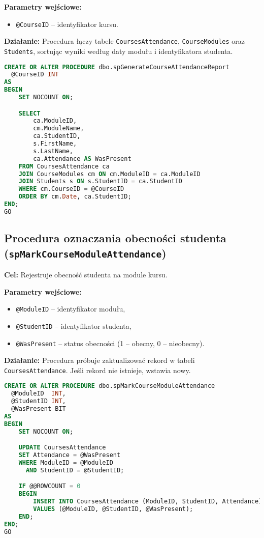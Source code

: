\documentclass[12pt]{article}
\begin{document}
\textbf{Parametry wejściowe:}
\begin{itemize}
  \item \verb|@CourseID| – identyfikator kursu.
\end{itemize}

\textbf{Działanie:} Procedura łączy tabele \verb|CoursesAttendance|, \verb|CourseModules| oraz \verb|Students|, sortując wyniki według daty modułu i identyfikatora studenta.

\begin{lstlisting}[language=SQL]
CREATE OR ALTER PROCEDURE dbo.spGenerateCourseAttendanceReport
  @CourseID INT
AS
BEGIN
    SET NOCOUNT ON;

    SELECT 
        ca.ModuleID,
        cm.ModuleName,
        ca.StudentID,
        s.FirstName,
        s.LastName,
        ca.Attendance AS WasPresent
    FROM CoursesAttendance ca
    JOIN CourseModules cm ON cm.ModuleID = ca.ModuleID
    JOIN Students s ON s.StudentID = ca.StudentID
    WHERE cm.CourseID = @CourseID
    ORDER BY cm.Date, ca.StudentID;
END;
GO
\end{lstlisting}

\newpage
\subsection{Procedura oznaczania obecności studenta (\texttt{spMarkCourseModuleAttendance})}
\textbf{Cel:} Rejestruje obecność studenta na module kursu.

\textbf{Parametry wejściowe:}
\begin{itemize}
  \item \verb|@ModuleID| – identyfikator modułu,
  \item \verb|@StudentID| – identyfikator studenta,
  \item \verb|@WasPresent| – status obecności (1 – obecny, 0 – nieobecny).
\end{itemize}

\textbf{Działanie:} Procedura próbuje zaktualizować rekord w tabeli \verb|CoursesAttendance|. Jeśli rekord nie istnieje, wstawia nowy.

\begin{lstlisting}[language=SQL]
CREATE OR ALTER PROCEDURE dbo.spMarkCourseModuleAttendance
  @ModuleID  INT,
  @StudentID INT,
  @WasPresent BIT
AS
BEGIN
    SET NOCOUNT ON;

    UPDATE CoursesAttendance
    SET Attendance = @WasPresent
    WHERE ModuleID = @ModuleID
      AND StudentID = @StudentID;

    IF @@ROWCOUNT = 0
    BEGIN
        INSERT INTO CoursesAttendance (ModuleID, StudentID, Attendance)
        VALUES (@ModuleID, @StudentID, @WasPresent);
    END;
END;
GO
\end{lstlisting}
\end{document}
